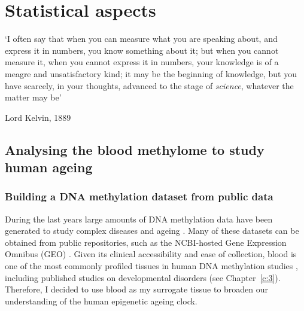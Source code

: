 
\chapter{Statistical aspects}  \label{c:2}

\ifpdf
\graphicspath{{Chapter2/Figs/pdf/}}
\else
\graphicspath{{Chapter2/Figs/svg/}}
\fi

\epigraph{`I often say that when you can measure what you are speaking about, and express it in numbers, you know something about it; but when you cannot measure it, when you cannot express it in numbers, your knowledge is of a meagre and unsatisfactory kind; it may be the beginning of knowledge, but you have scarcely, in your thoughts, advanced to the stage of \textit{science}, whatever the matter may be'}{Lord Kelvin, 1889 \cite{Kelvin1889}}

\section{Analysing the blood methylome to study human ageing}

\smallskip

\subsection{Building a DNA methylation dataset from public data}

\smallskip

During the last years large amounts of DNA methylation data have been generated to study complex diseases and ageing \cite{Rakyan2011,Flanagan2015}. Many of these datasets can be obtained from public repositories, such as the NCBI-hosted Gene Expression Omnibus (\acrshort{GEO}) \cite{Edgar2002}. Given its clinical accessibility and ease of collection, blood is one of the most commonly profiled tissues in human DNA methylation studies \cite{Flanagan2015}, including published studies on developmental disorders \cite{Aref-Eshghi2018} (see Chapter~\ref{c:3}). Therefore, I decided to use blood as my surrogate tissue to broaden our understanding of the human epigenetic ageing clock.

\bigskip

